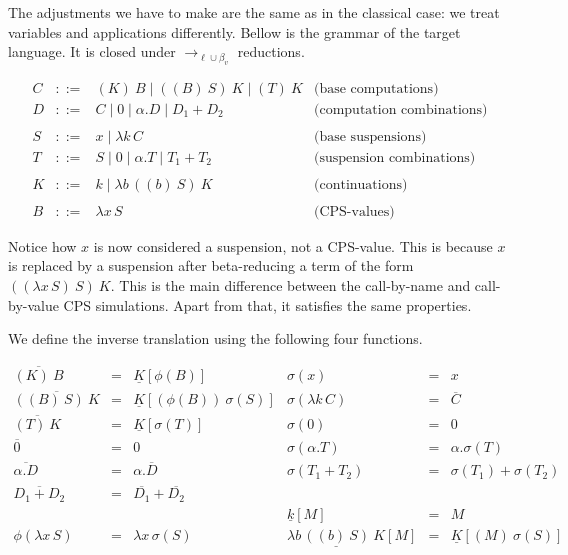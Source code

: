\documentclass{LMCS}
\newcommand{\xto}[1]{\ensuremath{\rightarrow_{#1}}}
\newcommand{\toblinred}{\xto{\ell\cup\beta_v}}
\begin{document}
The adjustments we have to make are the same as in the classical case: we treat variables and applications differently. Bellow is the grammar of the target language. It is closed under $\toblinred$
reductions.

\[
  \begin{array}{rcll}
    C & ::= & (K)~B \mid ((B)~S)~K \mid (T)~K & \mbox{(base computations)}\\
    D & ::= & C \mid 0 \mid \alpha.D \mid D_{1}+D_{2} & \mbox{(computation combinations)}\\\\
    S & ::= & x \mid \lambda k\,C & \mbox{(base suspensions)}\\
    T & ::= & S \mid 0 \mid \alpha.T \mid T_{1}+T_{2} & \mbox{(suspension combinations)}\\\\
    K & ::= & k \mid \lambda b\,((b)~S)~K & \mbox{(continuations)}\\\\
    B & ::= & \lambda x\,S & \mbox{(CPS-values)}
  \end{array}
\]


Notice how $x$ is now considered a suspension, not a CPS-value. This
is because $x$ is replaced by a suspension after beta-reducing a
term of the form $((\lambda x\,S)~S)~K$. This is the main difference between
the call-by-name and call-by-value CPS simulations. Apart from that,
it satisfies the same properties.

We define the inverse translation using the following four functions.

\[
  \begin{array}{rclrcl}
    \overline{(K)~B} & = & \underline{K}[\phi(B)] & \sigma(x) & = & x\\
    \overline{((B)~S)~K} & = & \underline{K}[(\phi(B))~\sigma(S)] & \sigma(\lambda k\,C) & = & \overline{C}\\
    \overline{(T)~K} & = & \underline{K}[\sigma(T)] & \sigma(0) & = & 0\\
    \overline{0} & = & 0 & \sigma(\alpha.T) & = & \alpha.\sigma(T)\\
    \overline{\alpha.D} & = & \alpha.\overline{D} & \sigma(T_{1}+T_{2}) & = & \sigma(T_{1})+\sigma(T_{2})\\
    \overline{D_{1}+D_{2}} & = & \overline{D_{1}}+\overline{D_{2}}\\
    &  &  & \underline{k}[M] & = & M\\
    \phi(\lambda x\,S) & = & \lambda x\,\sigma(S) & \underline{\lambda b\,((b)~S)~K}[M] & = & \underline{K}[(M)~\sigma(S)]
  \end{array}
\]
\end{document}
